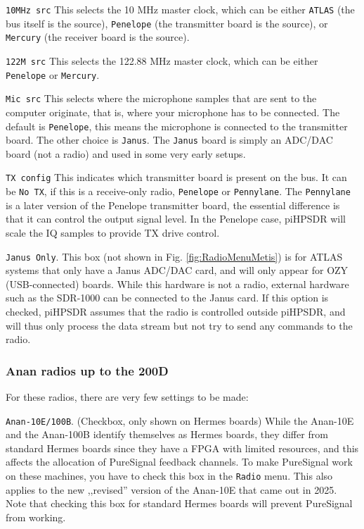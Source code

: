 \documentclass[12pt]{book}
\def\rett#1{\texttt{\color{red}#1}}
\def\bltt#1{\texttt{\color{blue}#1}}
\def\pH{pi\-HPSDR\xspace}
\begin{document}
\rett{10MHz src} This selects the 10 MHz master clock, which can be either \texttt{ATLAS}
(the bus itself is the source), \texttt{Penelope} (the transmitter board is the source),
or \texttt{Mercury} (the receiver board is the source).

\rett{122M src} This selects the 122.88 MHz master clock, which can be either
\texttt{Penelope} or \texttt{Mercury}.

\rett{Mic src} This selects where the microphone samples that are sent to the computer
originate, that is, where your microphone has to be connected. The default is
\texttt{Penelope}, this means the microphone is connected to the transmitter board. The
other choice is \texttt{Janus}. The \texttt{Janus} board is simply an ADC/DAC board (not
a radio) and used in some very early setups.

\rett{TX config} This indicates which transmitter board is present on the bus. It can
be \texttt{No TX}, if this is a receive-only radio, \texttt{Penelope} or \texttt{Pennylane}.
The \texttt{Pennylane} is a later version of the Penelope transmitter board, the essential
difference is that it can control the output signal level. In the Penelope case,
\pH will scale the IQ samples to provide TX drive control.

\rett{Janus Only}. This box (not shown in Fig. \ref{fig:RadioMenuMetis})
is for ATLAS systems that only have a Janus ADC/DAC card,
and will only appear for OZY (USB-connected) boards. While this hardware is not a radio,
external hardware such as the SDR-1000 can be connected to the Janus card. If this
option is checked, \pH assumes that the radio is controlled outside \pH, and
will thus only process the data stream but not try to send any commands to the radio.

\subsubsection{Anan radios up to the 200D}
For these radios, there are very few settings to be made:

\rett{Anan-10E/100B}. (Checkbox, only shown on Hermes boards)
While the Anan-10E and
the Anan-100B identify themselves as Hermes boards, they differ from standard
Hermes boards since they have a FPGA with limited
resources, and this affects the allocation of PureSignal feedback channels. To make
PureSignal work on these machines, you have to check this box in the \bltt{Radio} menu.
This also applies to the new ,,revised'' version of the Anan-10E that came out
in 2025. Note that checking this box for standard Hermes boards will prevent
PureSignal from working.
\end{document}
